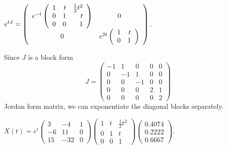 \documentclass{ximera}
\begin{document}
\ans $e^{tJ}= \left(\begin{array}{cc} e^{-t}\left(\begin{array}{rrr} 
 1 & t & \frac{1}{2}t^2\\ 0 & 1 & t\\ 0 & 0 & 1\end{array}\right) & 0\\ 0 &e^{2t}\left(\begin{array}{rr} 1 & t\\ 0 &1\end{array}\right)\end{array}\right)$.

\soln Since $J$ is a block form
\[
J = \left(\begin{array}{rrr|rr} 
-1 &  1 &  0 &  0 & 0 \\ 
 0 & -1 &  1 &  0 & 0 \\
 0 &  0 & -1 &  0 & 0 \\
\hline
 0 &  0 &  0 &  2 & 1 \\
 0 &  0 &  0 &  0 & 2
\end{array}\right)
\]
Jordan form matrix, we can exponentiate the diagonal blocks separately.

\ans $X(t) = e^t\left(\begin{array}{rrr}
     3  &  -4   &   1\\
    -6   &  11   &   0\\
    15   & -32   &   0 \end{array}\right)
\left(\begin{array}{rrr}
     1  &  t   &   \frac{1}{2}t^2\\
    0   &  1   &   t\\
    0   &  0   &   1 \end{array}\right)
\left(\begin{array}{r} 0.4074\\ 0.2222\\ 0.6667\end{array}\right)$.

\vspace{0.08in}
\end{document}
